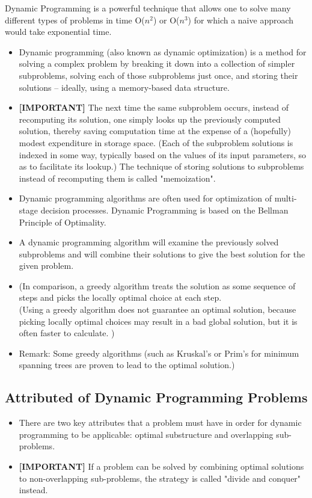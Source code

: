 \documentclass[]{article}
\begin{document}
\begin{framed}
\noindent Dynamic Programming is a powerful technique that allows one to solve many different types of
problems in time O($n^2$) or O($n^3$) for which a naive approach would take exponential time. 
\end{framed}
\begin{itemize}
	\item Dynamic programming (also known as dynamic optimization) is a method for solving a complex problem by breaking it down into a collection of simpler subproblems, 
	solving each of those subproblems just once, and storing their solutions – ideally, using a memory-based data structure. 
	
	\item \textbf{[IMPORTANT]} The next time the same subproblem occurs, instead of recomputing its solution, one simply looks up the previously computed solution, thereby saving computation time at the expense of a 
	(hopefully) modest expenditure in storage space. (Each of the subproblem solutions is indexed in some way, typically based on the values of its input parameters, so as to facilitate its lookup.) 
	The technique of storing solutions to subproblems instead of recomputing them is called "memoization".
	
	\item Dynamic programming algorithms are often used for optimization of multi-stage decision processes. Dynamic Programming is based on the Bellman Principle of Optimality.
	
	\item A dynamic programming algorithm will examine the previously solved subproblems and will combine 
	their solutions to give the best solution for the given problem. 
	
	\item (In comparison, a greedy algorithm treats the solution as some sequence of steps and picks the 
	locally optimal choice at each step. \\
	(Using a greedy algorithm does not guarantee an optimal solution, because picking locally 
	optimal choices may result in a bad global solution, but it is often faster to calculate. )
	
	\item Remark: Some greedy algorithms (such as Kruskal's or Prim's for minimum spanning trees 
	are proven to lead to the optimal solution.)
\end{itemize}

\subsection*{Attributed of Dynamic Programming Problems}
\begin{itemize}
	\item There are two key attributes that a problem must have in order for dynamic programming to be applicable: optimal substructure and overlapping sub-problems.
	\item \textbf{[IMPORTANT]} If a problem can be solved by combining optimal solutions to non-overlapping sub-problems, the strategy is called "divide and conquer" instead.
	
\end{itemize}
\end{document}
